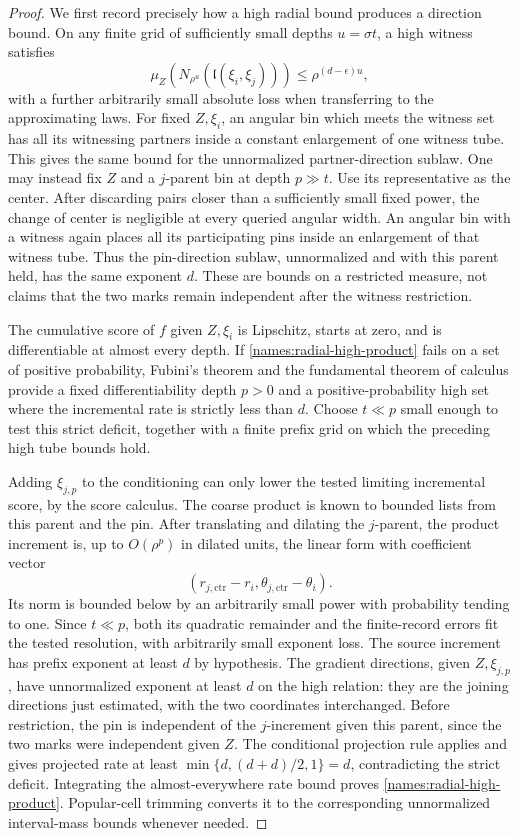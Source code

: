\begin{proof}
We first record precisely how a high radial bound produces a
direction bound.  On any finite grid of sufficiently small
depths $u=\sigma t$, a high witness satisfies
\[
 \mu_Z(N_{\rho^u}(\mathfrak l(\xi_i,\xi_j)))
                  \leq\rho^{(d-\epsilon)u},
\]
with a further arbitrarily small absolute loss when transferring
to the approximating laws.  For fixed $Z,\xi_i$, an angular bin
which meets the witness set has all its witnessing partners
inside a constant enlargement of one witness tube.  This gives
the same bound for the unnormalized partner-direction sublaw.
One may instead fix $Z$ and a $j$-parent bin at depth $p\gg t$.
Use its representative as the center.  After discarding pairs
closer than a sufficiently small fixed power, the change of
center is negligible at every queried angular width.  An
angular bin with a witness again places all its participating
pins inside an enlargement of that witness tube.  Thus the
pin-direction sublaw, unnormalized and with this parent held,
has the same exponent $d$.  These are bounds on a restricted
measure, not claims that the two marks remain independent
after the witness restriction.

The cumulative score of $f$ given $Z,\xi_i$ is Lipschitz,
starts at zero, and is differentiable at almost every depth.
If \eqref{names:radial-high-product} fails on a set of positive
probability, Fubini's theorem and the fundamental theorem of
calculus provide a fixed differentiability depth $p>0$ and a
positive-probability high set where the incremental rate is
strictly less than $d$.  Choose $t\ll p$ small enough to test
this strict deficit, together with a finite prefix grid on
which the preceding high tube bounds hold.

Adding $\xi_{j,p}$ to the conditioning can only lower the
tested limiting incremental score, by the score calculus.
The coarse product is known to bounded lists from this parent
and the pin.  After translating and dilating the $j$-parent,
the product increment is, up to $O(\rho^p)$ in dilated units,
the linear form with coefficient vector
\[
 (r_{j,\mathrm{ctr}}-r_i,
                  \theta_{j,\mathrm{ctr}}-\theta_i).
\]
Its norm is bounded below by an arbitrarily small power with
probability tending to one.  Since $t\ll p$, both its
quadratic remainder and the finite-record errors fit the
tested resolution, with arbitrarily small exponent loss.
The source increment has prefix exponent at least $d$ by
hypothesis.  The gradient directions, given $Z,\xi_{j,p}$,
have unnormalized exponent at least $d$ on the high relation:
they are the joining directions just estimated, with the two
coordinates interchanged.  Before restriction, the pin is
independent of the $j$-increment given this parent, since the
two marks were independent given $Z$.  The conditional
projection rule applies and gives projected rate at least
$\min\{d,(d+d)/2,1\}=d$, contradicting the strict deficit.
Integrating the almost-everywhere rate bound proves
\eqref{names:radial-high-product}.  Popular-cell trimming
converts it to the corresponding unnormalized interval-mass
bounds whenever needed.


\end{proof}
